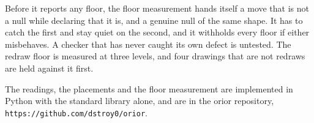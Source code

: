 Before it reports any floor, the floor measurement hands itself a move that is not a null while declaring that it is, and a genuine null of the same shape. It has to catch the first and stay quiet on the second, and it withholds every floor if either misbehaves. A checker that has never caught its own defect is untested. The redraw floor is measured at three levels, and four drawings that are not redraws are held against it first.

The readings, the placements and the floor measurement are implemented in Python with the standard library alone, and are in the orior repository, \texttt{https://github.com/dstroy0/orior}.
